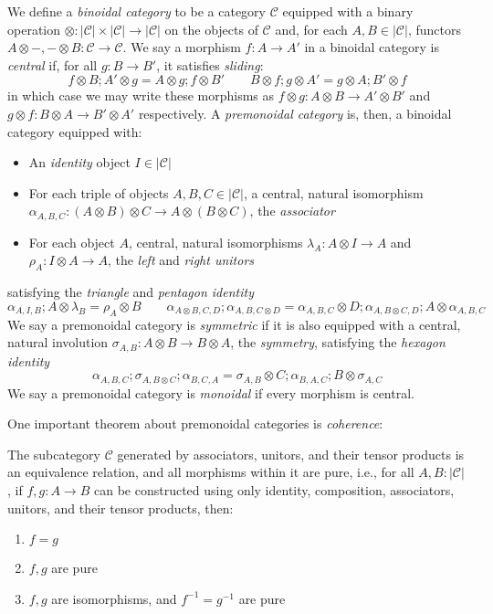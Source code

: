 \documentclass[acmsmall,screen,review]{acmart}
\newcommand{\mc}[1]{\ensuremath{\mathcal{#1}}}
\begin{document}
\begin{definition}
  We define a \emph{binoidal category} to be a category $\mc{C}$ equipped with a binary operation
  $\otimes : |\mc{C}| \times |\mc{C}| \to |\mc{C}|$ on the objects of $\mc{C}$ and, for each $A, B
  \in |\mc{C}|$, functors $A \otimes -, - \otimes B : \mc{C} \to \mc{C}$. We say a morphism $f : A
  \to A'$ in a binoidal category is \emph{central} if, for all $g : B \to B'$, it satisfies
  \emph{sliding}:
  $$
  f \otimes B ; A' \otimes g = A \otimes g ; f \otimes B' \qquad
  B \otimes f ; g \otimes A' = g \otimes A ; B' \otimes f
  $$
  in which case we may write these morphisms as $f \otimes g : A \otimes B \to A' \otimes B'$ and $g
  \otimes f : B \otimes A \to B' \otimes A'$ respectively. A \emph{premonoidal category} is, then, a
  binoidal category equipped with:
  \begin{itemize}
    \item An \emph{identity} object $I \in |\mc{C}|$
    \item For each triple of objects $A, B, C \in |\mc{C}|$, a central, natural isomorphism
    $\alpha_{A, B, C} : (A \otimes B) \otimes C \to A \otimes (B \otimes C)$, the \emph{associator}
    \item For each object $A$, central, natural isomorphisms $\lambda_A : A \otimes I \to A$ and
    $\rho_A : I \otimes A \to A$, the \emph{left} and \emph{right unitors}
  \end{itemize}
  satisfying the \emph{triangle} and \emph{pentagon identity}
  $$
  \alpha_{A, I, B} ; A \otimes \lambda_B = \rho_A \otimes B \qquad
  \alpha_{A \otimes B, C, D} ; \alpha_{A, B, C \otimes D}
  = \alpha_{A, B, C} \otimes D ; \alpha_{A, B \otimes C, D} ; A \otimes \alpha_{A, B, C}
  $$
  We say a premonoidal category is \emph{symmetric} if it is also equipped with a central, natural
  involution $\sigma_{A, B} : A \otimes B \to B \otimes A$, the \textit{symmetry}, satisfying the
  \emph{hexagon identity}
  $$
  \alpha_{A, B, C} ; \sigma_{A, B \otimes C} ; \alpha_{B, C, A}
  = \sigma_{A, B} \otimes C ; \alpha_{B, A, C} ; B \otimes \sigma_{A, C}
  $$
  We say a premonoidal category is \emph{monoidal} if every morphism is central.
\end{definition}
One important theorem about premonoidal categories is \emph{coherence}:
\begin{theorem}
  The subcategory $\mc{C}$ generated by associators, unitors, and their tensor products is an
  equivalence relation, and all morphisms within it are pure, i.e., for all $A, B : |\mc{C}|$, if
  $f, g : A \to B$ can be constructed using only identity, composition, associators, unitors, and
  their tensor products, then:
  \begin{enumerate}[label=(\alph*)]
    \item $f = g$
    \item $f, g$ are pure
    \item $f, g$ are isomorphisms, and $f^{-1} = g^{-1}$ are pure
  \end{enumerate}
  \label{thm:monoidal-coherence}
\end{theorem}
\end{document}
